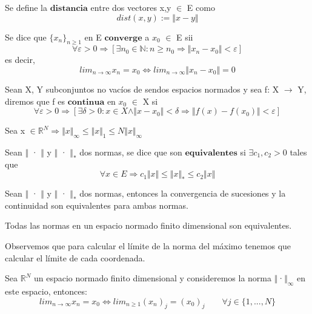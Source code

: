 \begin{ndef}[Distancia]
Se define la $\textbf{distancia}$ entre dos vectores x,y $\in$ E como
\[ dist(x,y) := \Vert x - y \Vert \]
\end{ndef}

\begin{ndef}
Se dice que $\lbrace x_n \rbrace _{n \geq 1}$ en E $\textbf{converge}$ a $x_0$ $\in$ E sii
\[ \forall \varepsilon > 0 \Rightarrow \left[ \exists n_0 \in \mathbb{N} : n \geq n_0 \Rightarrow \Vert x_n - x_0 \Vert < \varepsilon \right] \]
es decir,
\[ lim_{n \rightarrow \infty} x_n = x_0  \Leftrightarrow lim_{n \rightarrow \infty} \Vert x_n - x_0 \Vert = 0 \]
\end{ndef}

\begin{ndef}
Sean X, Y subconjuntos no vacíos de sendos espacios normados y sea f: X $\rightarrow$ Y, diremos que f es $\textbf{continua}$ en $x_{0}$ $\in$ X si
\[ \forall \varepsilon > 0 \Rightarrow \left[ \exists \delta > 0 : x \in X \wedge \Vert x - x_0 \Vert < \delta \Rightarrow \Vert f(x) - f(x_0) \Vert < \varepsilon \right] \]
\end{ndef}

\begin{nprop}
Sea x $\in \mathbb{R}^N \Rightarrow \Vert x \Vert _\infty \leq \Vert x \Vert _1 \leq N\Vert x \Vert _\infty $ 
\end{nprop}

\begin{ndef}
Sean $\Vert$ · $\Vert$ y $\Vert$ · $\Vert _*$ dos normas, se dice que son $\textbf{equivalentes}$ si $\exists c_1, c_2 > 0$ tales que
\[ \forall x \in E \Rightarrow c_1\Vert x \Vert \leq \Vert x \Vert _* \leq c_2\Vert x \Vert \] 
\end{ndef}

\begin{nprop}
Sean $\Vert$ · $\Vert$ y $\Vert$ · $\Vert _*$ dos normas, entonces la convergencia de sucesiones y la continuidad son equivalentes para ambas normas. 
\end{nprop}

\begin{nth}
Todas las normas en un espacio normado finito dimensional son equivalentes.
\end{nth}

Observemos que para calcular el límite de la norma del máximo tenemos que calcular el límite de cada coordenada.

\begin{nprop}
Sea $\mathbb{R}^N$ un espacio normado finito dimensional y consideremos la norma $\Vert$·$\Vert _\infty$ en este espacio, entonces:
\[ lim_{n \rightarrow \infty}x_n = x_0 \Leftrightarrow lim_{n \geq 1}(x_n)_j = (x_0)_j \qquad \forall j\in \lbrace 1,...,N \rbrace \]
\end{nprop}

